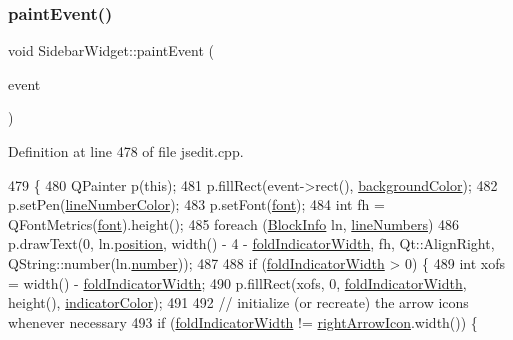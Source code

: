 \subsubsection{\texorpdfstring{paint\+Event()}{paintEvent()}}
{\footnotesize\ttfamily void Sidebar\+Widget\+::paint\+Event (\begin{DoxyParamCaption}\item[{Q\+Paint\+Event $\ast$}]{event }\end{DoxyParamCaption})\hspace{0.3cm}{\ttfamily [protected]}}



Definition at line 478 of file jsedit.\+cpp.


\begin{DoxyCode}
479 \{
480     QPainter p(\textcolor{keyword}{this});
481     p.fillRect(event->rect(), \hyperlink{class_sidebar_widget_a71151528db89c451ad8aa0c31694c27a}{backgroundColor});
482     p.setPen(\hyperlink{class_sidebar_widget_a0a577ea7fe9a4f2075fa19d1e601f987}{lineNumberColor});
483     p.setFont(\hyperlink{class_sidebar_widget_a8c38342a3799d3bfbe9671b3f5d28e1f}{font});
484     \textcolor{keywordtype}{int} fh = QFontMetrics(\hyperlink{class_sidebar_widget_a8c38342a3799d3bfbe9671b3f5d28e1f}{font}).height();
485     \textcolor{keywordflow}{foreach} (\hyperlink{struct_block_info}{BlockInfo} ln, \hyperlink{class_sidebar_widget_ac6820d4338c9763dd3b6a2da710a0fb0}{lineNumbers})
486         p.drawText(0, ln.\hyperlink{struct_block_info_a6333e999c5d9f3e8882776e66eb087c0}{position}, width() - 4 - \hyperlink{class_sidebar_widget_a8be447556cc4ec612153b05eec332513}{foldIndicatorWidth}, fh, 
      Qt::AlignRight, QString::number(ln.\hyperlink{struct_block_info_a7f39cc445f8a30a859859f49e59640ee}{number}));
487 
488     \textcolor{keywordflow}{if} (\hyperlink{class_sidebar_widget_a8be447556cc4ec612153b05eec332513}{foldIndicatorWidth} > 0) \{
489         \textcolor{keywordtype}{int} xofs = width() - \hyperlink{class_sidebar_widget_a8be447556cc4ec612153b05eec332513}{foldIndicatorWidth};
490         p.fillRect(xofs, 0, \hyperlink{class_sidebar_widget_a8be447556cc4ec612153b05eec332513}{foldIndicatorWidth}, height(), 
      \hyperlink{class_sidebar_widget_a0221f90d581113d83c73af06e1738067}{indicatorColor});
491 
492         \textcolor{comment}{// initialize (or recreate) the arrow icons whenever necessary}
493         \textcolor{keywordflow}{if} (\hyperlink{class_sidebar_widget_a8be447556cc4ec612153b05eec332513}{foldIndicatorWidth} != \hyperlink{class_sidebar_widget_a7af9c03c7765c0ba88116fb397de74b5}{rightArrowIcon}.width()) \{

\end{DoxyCode}
